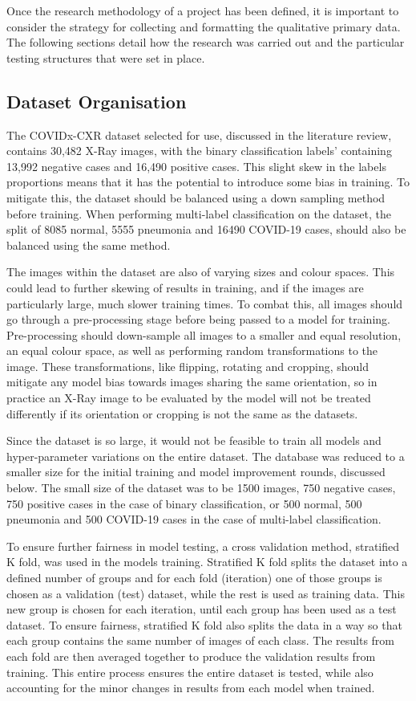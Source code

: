 Once the research methodology of a project has been defined, it is important to consider the strategy for collecting and formatting the qualitative primary data. The following sections detail how the research was carried out and the particular testing structures that were set in place.

\subsection{Dataset Organisation}
The COVIDx-CXR dataset selected for use, discussed in the literature review, contains 30,482 X-Ray images, with the binary classification labels' containing 13,992 negative cases and 16,490 positive cases. This slight skew in the labels proportions means that it has the potential to introduce some bias in training. To mitigate this, the dataset should be balanced using a down sampling method before training. When performing multi-label classification on the dataset, the split of 8085 normal, 5555 pneumonia and 16490 COVID-19 cases, should also be balanced using the same method.

The images within the dataset are also of varying sizes and colour spaces. This could lead to further skewing of results in training, and if the images are particularly large, much slower training times. To combat this, all images should go through a pre-processing stage before being passed to a model for training. Pre-processing should down-sample all images to a smaller and equal resolution, an equal colour space, as well as performing random transformations to the image. These transformations, like flipping, rotating and cropping, should mitigate any model bias towards images sharing the same orientation, so in practice an X-Ray image to be evaluated by the model will not be treated differently if its orientation or cropping is not the same as the datasets.

Since the dataset is so large, it would not be feasible to train all models and hyper-parameter variations on the entire dataset. The database was reduced to a smaller size for the initial training and model improvement rounds, discussed below. The small size of the dataset was to be 1500 images, 750 negative cases, 750 positive cases in the case of binary classification, or 500 normal, 500 pneumonia and 500 COVID-19 cases in the case of multi-label classification.

To ensure further fairness in model testing, a cross validation method, stratified K fold, was used in the models training. Stratified K fold splits the dataset into a defined number of groups and for each fold (iteration) one of those groups is chosen as a validation (test) dataset, while the rest is used as training data. This new group is chosen for each iteration, until each group has been used as a test dataset. To ensure fairness, stratified K fold also splits the data in a way so that each group contains the same number of images of each class. The results from each fold are then averaged together to produce the validation results from training. This entire process ensures the entire dataset is tested, while also accounting for the minor changes in results from each model when trained.

